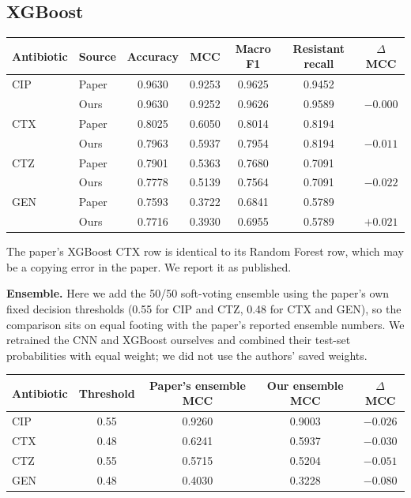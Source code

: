 \documentclass[11pt]{article}
\begin{document}
\subsection*{XGBoost}
\begin{center}
\begin{tabular}{llccccc}
\toprule
\textbf{Antibiotic} & \textbf{Source} & \textbf{Accuracy} & \textbf{MCC} & \textbf{Macro F1} & \textbf{Resistant recall} & \textbf{$\Delta$MCC} \\
\midrule
CIP & Paper & 0.9630 & 0.9253 & 0.9625 & 0.9452 & \\
    & Ours & 0.9630 & 0.9252 & 0.9626 & 0.9589 & $-0.000$ \\
CTX & Paper & 0.8025 & 0.6050 & 0.8014 & 0.8194 & \\
    & Ours & 0.7963 & 0.5937 & 0.7954 & 0.8194 & $-0.011$ \\
CTZ & Paper & 0.7901 & 0.5363 & 0.7680 & 0.7091 & \\
    & Ours & 0.7778 & 0.5139 & 0.7564 & 0.7091 & $-0.022$ \\
GEN & Paper & 0.7593 & 0.3722 & 0.6841 & 0.5789 & \\
    & Ours & 0.7716 & 0.3930 & 0.6955 & 0.5789 & $+0.021$ \\
\bottomrule
\end{tabular}
\end{center}

The paper's XGBoost CTX row is identical to its Random Forest row, which may be a copying error in the paper. We report it as published.

\textbf{Ensemble.} Here we add the 50/50 soft-voting ensemble using the paper's own fixed decision thresholds (0.55 for CIP and CTZ, 0.48 for CTX and GEN), so the comparison sits on equal footing with the paper's reported ensemble numbers. We retrained the CNN and XGBoost ourselves and combined their test-set probabilities with equal weight; we did not use the authors' saved weights.

\begin{center}
\begin{tabular}{lcccc}
\toprule
\textbf{Antibiotic} & \textbf{Threshold} & \textbf{Paper's ensemble MCC} & \textbf{Our ensemble MCC} & \textbf{$\Delta$MCC} \\
\midrule
CIP & 0.55 & 0.9260 & 0.9003 & $-0.026$ \\
CTX & 0.48 & 0.6241 & 0.5937 & $-0.030$ \\
CTZ & 0.55 & 0.5715 & 0.5204 & $-0.051$ \\
GEN & 0.48 & 0.4030 & 0.3228 & $-0.080$ \\
\bottomrule
\end{tabular}
\end{center}
\end{document}

